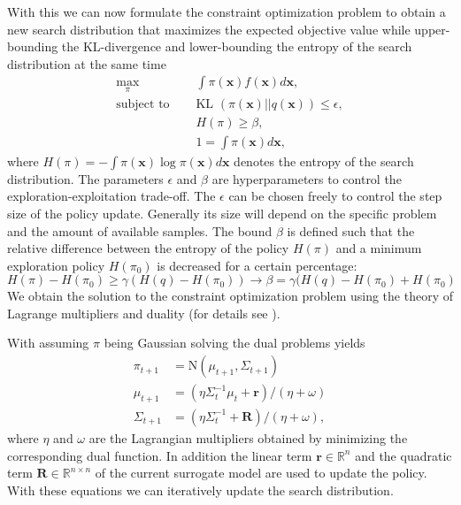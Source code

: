 With this we can now formulate the constraint optimization
problem to obtain a new search
distribution that maximizes the expected objective value
while upper-bounding the KL-divergence and lower-bounding the entropy
of the search distribution at the same time
\begin{equation*}
  \begin{aligned}
    \max_{\pi} \quad &\int \pi(\mathbf{x}) f(\mathbf{x}) d\mathbf{x}, \\
    \text{subject to } \quad &\text{KL }(\pi(\mathbf{x})||q(\mathbf{x})) \leq \epsilon, \\
     &H(\pi) \geq \beta, \\
     &1 = \int \pi(\mathbf{x}) d\mathbf{x},
  \end{aligned}
\end{equation*}
where $H(\pi) = - \int \pi(\mathbf{x}) \log \pi(\mathbf{x}) d\mathbf{x}$ denotes
the entropy of the search distribution.
The parameters $\epsilon$ and $\beta$ are hyperparameters to control the
exploration-exploitation trade-off.
The $\epsilon$ can be chosen freely to control the step size of the
policy update. Generally its size will depend on the specific problem
and the amount of available samples.
The bound $\beta$ is defined such that the relative difference
between the entropy
of the policy $H(\pi)$ and a minimum exploration policy $H(\pi_0)$ is
decreased
for a certain percentage:
$$ H(\pi) - H(\pi_0) \geq \gamma (H(q) - H(\pi_0))
\rightarrow \beta = \gamma (H(q) - H(\pi_0) + H(\pi_0) $$
We obtain the solution to the constraint optimization
problem using the theory of Lagrange multipliers and duality
(for details see ).


With assuming $\pi$ being Gaussian solving the dual problems yields
\begin{equation}
  \label{policy_update}
  \begin{aligned}
    \pi_{t+1} &= \text{N}(\mu_{t+1}, \Sigma_{t+1}) \\
    \mu_{t+1} &= (\eta \Sigma_{t}^{-1}\mu_t + \mathbf{r}) / (\eta + \omega) \\
    \Sigma_{t+1} &= (\eta \Sigma_t^{-1} + \mathbf{R}) / (\eta + \omega),
  \end{aligned}
\end{equation}
where $\eta$ and $\omega$ are the Lagrangian multipliers obtained by minimizing
the corresponding dual function. In addition
the linear term  $\mathbf{r} \in \mathbb{R}^n$ and
the quadratic term $\mathbf{R} \in \mathbb{R}^{n\times n}$  of the current surrogate model are
used to update the policy.
With these equations we can iteratively update the search distribution.

